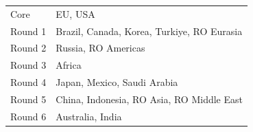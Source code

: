 \begin{tabular}{ll}
\toprule
Core & EU, USA \\
Round 1 & Brazil, Canada, Korea, Turkiye, RO Eurasia \\
Round 2 & Russia, RO Americas \\
Round 3 & Africa \\
Round 4 & Japan, Mexico, Saudi Arabia \\
Round 5 & China, Indonesia, RO Asia, RO Middle East \\
Round 6 & Australia, India \\
\bottomrule
\end{tabular}
